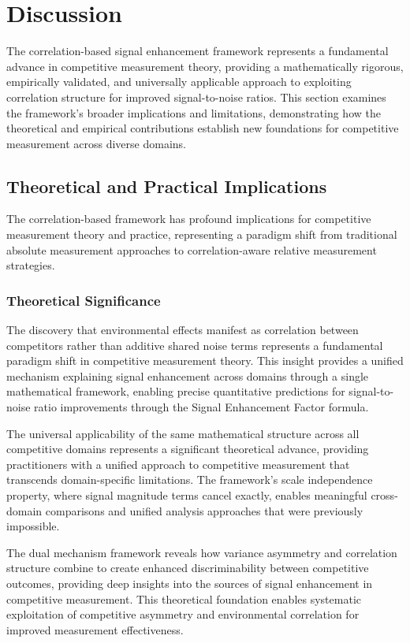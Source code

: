 \section{Discussion}

The correlation-based signal enhancement framework represents a fundamental advance in competitive measurement theory, providing a mathematically rigorous, empirically validated, and universally applicable approach to exploiting correlation structure for improved signal-to-noise ratios. This section examines the framework's broader implications and limitations, demonstrating how the theoretical and empirical contributions establish new foundations for competitive measurement across diverse domains.

\subsection{Theoretical and Practical Implications}

The correlation-based framework has profound implications for competitive measurement theory and practice, representing a paradigm shift from traditional absolute measurement approaches to correlation-aware relative measurement strategies.

\subsubsection{Theoretical Significance}

The discovery that environmental effects manifest as correlation between competitors rather than additive shared noise terms represents a fundamental paradigm shift in competitive measurement theory. This insight provides a unified mechanism explaining signal enhancement across domains through a single mathematical framework, enabling precise quantitative predictions for signal-to-noise ratio improvements through the Signal Enhancement Factor formula.

The universal applicability of the same mathematical structure across all competitive domains represents a significant theoretical advance, providing practitioners with a unified approach to competitive measurement that transcends domain-specific limitations. The framework's scale independence property, where signal magnitude terms cancel exactly, enables meaningful cross-domain comparisons and unified analysis approaches that were previously impossible.

The dual mechanism framework reveals how variance asymmetry and correlation structure combine to create enhanced discriminability between competitive outcomes, providing deep insights into the sources of signal enhancement in competitive measurement. This theoretical foundation enables systematic exploitation of competitive asymmetry and environmental correlation for improved measurement effectiveness.

